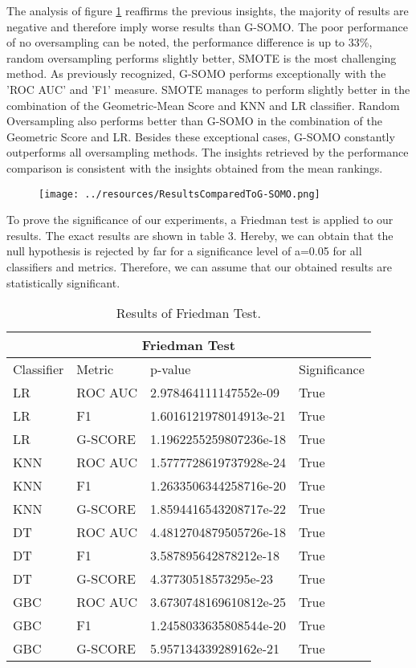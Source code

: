 \documentclass[parskip=full]{scrartcl}
\begin{document}
The analysis of figure \ref{fig:AvgScore} reaffirms the previous insights, the majority of results are negative and therefore imply worse results than G-SOMO. The poor performance of no oversampling can be noted, the performance difference is up to 33\%, random oversampling performs slightly better, SMOTE is the most challenging method. As previously recognized, G-SOMO performs exceptionally with the 'ROC AUC' and 'F1' measure. SMOTE manages to perform slightly better in the combination of the Geometric-Mean Score and KNN and LR classifier. Random Oversampling also performs better than G-SOMO in the combination of the Geometric Score and LR. Besides these exceptional cases, G-SOMO constantly outperforms all oversampling methods. The insights retrieved by the performance comparison is consistent with the insights obtained from the mean rankings. 

\begin{figure}[H]
	\centering
	\texttt{[image: ../resources/ResultsComparedToG-SOMO.png]}
	\label{fig:AvgScore}
\end{figure}

To prove the significance of our experiments, a Friedman test is applied to our results. The exact results are shown in table 3. Hereby, we can obtain that the null hypothesis is rejected by far for a significance level of a=0.05 for all classifiers and metrics. Therefore, we can assume that our obtained results are statistically significant. 

\begin{table} [h]
   \scriptsize
   \centering

\begin{tabular}{ |p{2cm}||p{2cm}|p{4cm}|p{2cm}|  }  
 \hline
 \multicolumn{4}{|c|}{Friedman Test} \\
 \hline
Classifier & Metric & p-value & Significance \\
 \hline
 
LR&	ROC AUC&	2.978464111147552e-09&	True\\
LR&	F1&	1.6016121978014913e-21&	True\\
LR&	G-SCORE&	1.1962255259807236e-18&	True\\
KNN&	ROC AUC&	1.5777728619737928e-24&	True\\
KNN&	F1&	1.2633506344258716e-20&	True\\
KNN&	G-SCORE&	1.8594416543208717e-22&	True\\
DT&	ROC AUC&	4.4812704879505726e-18&	True\\
DT&	F1&	3.587895642878212e-18&	True\\
DT&	G-SCORE&	4.37730518573295e-23&	True\\
GBC&	ROC AUC&	3.6730748169610812e-25&	True\\
GBC&	F1&	1.2458033635808544e-20&	True\\
GBC&	G-SCORE&	5.957134339289162e-21&	True\\

 \hline
\end{tabular}

\caption{Results of Friedman Test.}
   \label{tab:test}
\end{table} 
\end{document}
